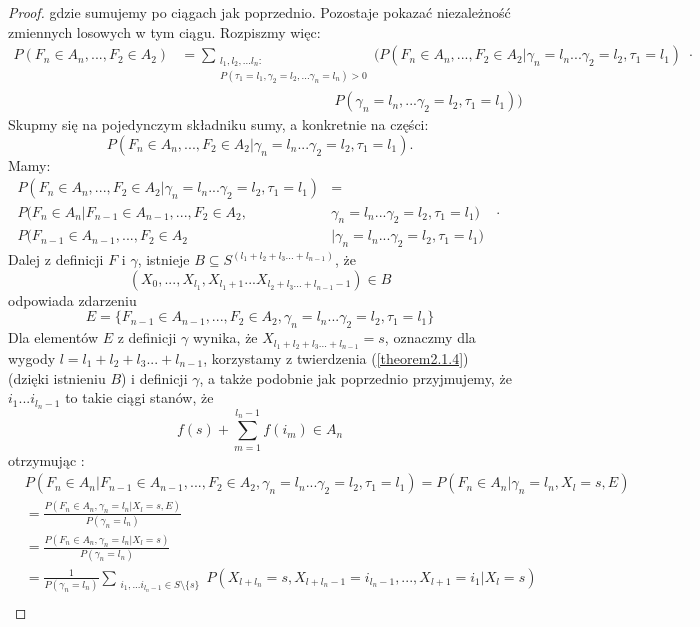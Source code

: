 \documentclass[a4paper]{article}
\theoremstyle{defn}
\theoremstyle{theorem}
\theoremstyle{lemma}
\theoremstyle{cor}
\theoremstyle{fact}
\begin{document}
\begin{proof}
gdzie sumujemy po ciągach jak poprzednio.
Pozostaje pokazać niezależność zmiennych losowych w tym ciągu. Rozpiszmy więc:
\begin{align*}
    P(F_n \in A_n, ..., F_2 \in A_2) &= \sum\limits_{\substack{l_1, l_2, ... l_n:\\P(\tau_1 = l_1, \gamma_2 = l_2, ... \gamma_n = l_n) > 0}}(P(F_n \in A_n, ..., F_2 \in A_2|\gamma_n = l_n ... \gamma_2 = l_2, \tau_1 = l_1)\,\, \cdot \\
    &\quad\quad\quad\quad\quad\quad\quad\quad\quad\quad\quad P(\gamma_n = l_n, ... \gamma_2 = l_2, \tau_1 = l_1))
\end{align*}
Skupmy się na pojedynczym składniku sumy, a konkretnie na części:
$$P(F_n \in A_n, ..., F_2 \in A_2|\gamma_n = l_n ... \gamma_2 = l_2, \tau_1 = l_1).$$
Mamy:
\begin{align*}
    P(F_n \in A_n, ..., F_2 \in A_2 |\gamma_n = l_n ... \gamma_2 = l_2, \tau_1 = l_1) &=\\
    P(F_n \in A_n|F_{n-1} \in A_{n-1},  ..., F_2 \in A_2, &\gamma_n = l_n ... \gamma_2 = l_2, \tau_1 = l_1)\quad \cdot \\
    P(F_{n-1} \in A_{n-1},  ..., F_2 \in A_2 &|\gamma_n = l_n ... \gamma_2 = l_2, \tau_1 = l_1)
\end{align*}
Dalej z definicji $F$ i $\gamma$, istnieje $B \subseteq S^{(l_1 + l_2 + l_3 ... +l_{n-1})}$, że $$(X_0, ..., X_{l_1}, X_{l_1+1} ... X_{l_2 + l_3 ... + l_{n-1} - 1}) \in B$$
odpowiada zdarzeniu
$$E = \{F_{n-1} \in A_{n-1},  ..., F_2 \in A_2, \gamma_n = l_n ... \gamma_2 = l_2, \tau_1 = l_1\}$$
Dla elementów $E$ z definicji $\gamma$ wynika, że $X_{l_1 + l_2 + l_3 ... + l_{n-1}} = s$, oznaczmy dla wygody $l = l_1 + l_2 + l_3 ... + l_{n-1}$, korzystamy z twierdzenia (\ref{theorem2.1.4}) (dzięki istnieniu $B$) i definicji $\gamma$, a także podobnie jak poprzednio przyjmujemy, że $i_1 ... i_{l_n-1}$ to takie ciągi stanów, że $$f(s) + \sum\limits_{m = 1}^{l_n-1} f(i_m) \in A_n$$
otrzymując :
\begin{align*}
    &P(F_n \in A_n|F_{n-1} \in A_{n-1},  ..., F_2 \in A_2, \gamma_n = l_n ... \gamma_2 = l_2, \tau_1 = l_1) = P(F_n \in A_n|\gamma_n = l_n, X_l = s, E)
\end{align*}
\begin{align*}
    &= \frac{P(F_n \in A_n, \gamma_n = l_n | X_l = s, E)}{P(\gamma_n = l_n)}\\
    &= \frac{P(F_n \in A_n, \gamma_n = l_n | X_l = s)}{P(\gamma_n = l_n)}\\
    &= \frac{1}{P(\gamma_n = l_n)} \sum\limits_{\substack{i_1, ... i_{l_n - 1} \in S\setminus \{s\}}} P(X_{l+l_n} = s, X_{l+l_{n}-1} = i_{l_{n}-1}, ..., X_{l+1} = i_1 | X_l = s)\\

\end{align*}
\end{proof}
\end{document}
